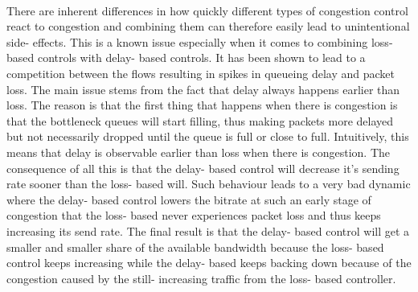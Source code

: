 \documentclass[UKenglish]{ifimaster}
\begin{document}
\paragraph{}
There are inherent differences in how quickly different types of congestion control react to congestion and combining them can therefore easily lead to unintentional side- effects. 
This is a known issue especially when it comes to combining loss- based controls with delay- based controls.
It has been shown to lead to a competition between the flows resulting in spikes in queueing delay and packet loss. 
The main issue stems from the fact that delay always happens earlier than loss.
The reason is that the first thing that happens when there is congestion is that the bottleneck queues will start filling, thus making packets more delayed but not necessarily dropped until the queue is full or close to full.
Intuitively, this means that delay is observable earlier than loss when there is congestion.
The consequence of all this is that the delay- based control will decrease it's sending rate sooner than the loss- based will. 
Such behaviour leads to a very bad dynamic where the delay- based control lowers the bitrate at such an early stage of congestion that the loss- based never experiences packet loss and thus keeps increasing its send rate. 
The final result is that the delay- based control will get a smaller and smaller share of the available bandwidth because the loss- based control keeps increasing while the delay- based keeps backing down because of the congestion caused by the still- increasing traffic from the loss- based controller.
\end{document}

